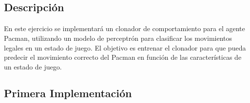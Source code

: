 \documentclass{report}
\begin{document}
      \subsection*{Descripción}
        \paragraph*{}{
          En este ejercicio se implementará un clonador de comportamiento para el agente Pacman, utilizando un modelo de perceptrón para clasificar los movimientos legales en un estado de juego.
          El objetivo es entrenar el clonador para que pueda predecir el movimiento correcto del Pacman en función de las características de un estado de juego.\\
        }
      \subsection*{Primera Implementación}
\end{document}
